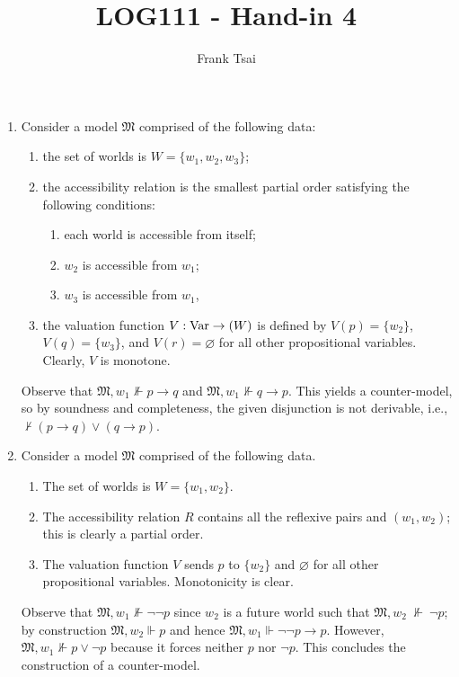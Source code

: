 \documentclass[a4paper]{article}
\title{LOG111 - Hand-in 4}
\author{Frank Tsai}
\newcommand{\M}{\mathfrak{M}}
\let\P\relax
\newcommand{\P}{\mathcal{P}}
\newcommand{\Var}{\text{Var}}
\newcommand{\set}[1]{\mathopen{}\{#1\mathclose{}\}}
\begin{document}
\maketitle

\section{}
\label{sec:1}

\begin{enumerate}
\item Consider a model $\M$ comprised of the following data:
  \begin{enumerate}
  \item the set of worlds is $W = \set{w_1,w_2,w_3}$;
  \item the accessibility relation is the smallest partial order satisfying the following conditions:
    \begin{enumerate}
    \item each world is accessible from itself;
    \item $w_2$ is accessible from $w_1$;
    \item $w_3$ is accessible from $w_1$,
    \end{enumerate}
  \item the valuation function $V: \Var \to \P(W)$ is defined by $V(p) = \set{w_{2}}$, $V(q) = \set{w_{3}}$, and $V(r) = \varnothing$ for all other propositional variables.
    Clearly, $V$ is monotone.
  \end{enumerate}
  Observe that $\M,w_1 \nVdash p \to q$ and $\M,w_1 \nVdash q \to p$.
  This yields a counter-model, so by soundness and completeness, the given disjunction is not derivable, i.e., $\nvdash (p \to q) \vee (q \to p)$.
\item Consider a model $\M$ comprised of the following data.
  \begin{enumerate}
  \item The set of worlds is $W = \set{w_1,w_2}$.
  \item The accessibility relation $R$ contains all the reflexive pairs and $(w_1,w_2)$; this is clearly a partial order.
  \item The valuation function $V$ sends $p$ to $\set{w_2}$ and $\varnothing$ for all other propositional variables.
    Monotonicity is clear.
  \end{enumerate}
  Observe that $\M,w_1 \nVdash \lnot\lnot p$ since $w_2$ is a future world such that $\M,w_2~\nVdash~\lnot p$; by construction $\M,w_2 \Vdash p$ and hence $\M,w_1 \Vdash \lnot\lnot p \to p$.
  However, $\M,w_1 \nVdash p \vee \lnot p$ because it forces neither $p$ nor $\lnot p$.
  This concludes the construction of a counter-model.
\end{enumerate}
\end{document}

